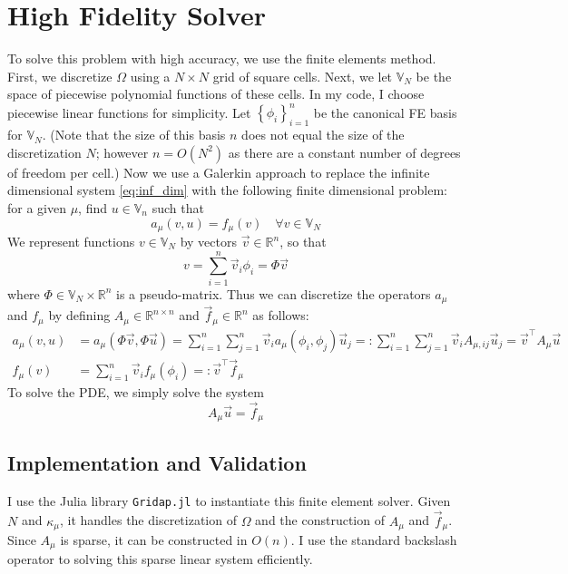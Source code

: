 \documentclass[11pt]{article}
\newcommand{\R}{\mathbb{R}}
\newcommand{\set}[1]{\left \{ #1 \right \}}
\newcommand{\sumin}{\sum_{i=1}^n}
\newcommand{\sumjn}{\sum_{j=1}^n}
\begin{document}
\section{High Fidelity Solver}
To solve this problem with high accuracy, we use the finite elements method.
First, we discretize $\Omega$ using a $N \times N$ grid of square cells.
Next, we let $\mathbb V_N$ be the space of piecewise polynomial functions of these cells.
In my code, I choose piecewise linear functions for simplicity.
Let $\set{\phi_i}_{i=1}^n$ be the canonical FE basis for $\mathbb V_N$.
(Note that the size of this basis $n$ does not equal the size of the discretization $N$;
however $n = O(N^2)$ as there are a constant number of degrees of freedom per cell.)
Now we use a Galerkin approach to replace the infinite dimensional system \ref{eq:inf_dim}
with the following finite dimensional problem: for a given $\mu$,
find $u \in \mathbb V_n$ such that
\begin{equation}
    a_{\mu}(v, u) = f_{\mu}(v) \quad \forall v \in \mathbb V_N
\end{equation}
We represent functions $v \in \mathbb V_N$ by vectors $\vec v \in \R^n$, so that
\[ v = \sumin \vec v_i \phi_i = \Phi \vec v \]
where $\Phi \in \mathbb V_N \times \R^n$ is a pseudo-matrix.
Thus we can discretize the operators $a_{\mu}$ and $f_{\mu}$
by defining $A_{\mu} \in \R^{n \times n}$ and $\vec f_{\mu} \in \R^n$ as follows:
\begin{align*}
    a_{\mu}(v, u) &= a_{\mu}(\Phi \vec v, \Phi \vec u) = \sumin \sumjn \vec v_i a_{\mu}(\phi_i, \phi_j) \vec u_j =: \sumin \sumjn \vec v_i A_{\mu, ij} \vec u_j = \vec v^\top A_{\mu} \vec u\\
    f_{\mu}(v) &= \sumin \vec v_i f_{\mu}(\phi_i) =: \vec v^\top \vec f_{\mu}
\end{align*}
To solve the PDE, we simply solve the system
\[ A_{\mu} \vec u = \vec f_{\mu} \]

\subsection{Implementation and Validation}
I use the Julia library \texttt{Gridap.jl} \cite{Badia2020} to instantiate this finite element solver.
Given $N$ and $\kappa_{\mu}$, it handles the discretization of $\Omega$
and the construction of $A_{\mu}$ and $\vec f_{\mu}$.
Since $A_{\mu}$ is sparse, it can be constructed in $O(n)$.
I use the standard backslash operator to solving this sparse linear system efficiently.\\
\end{document}
